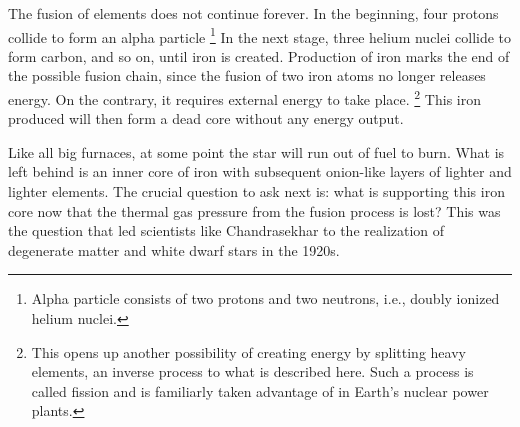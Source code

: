 The fusion of elements does not continue forever.
In the beginning, four protons collide to form an alpha particle%
\footnote{Alpha particle consists of two protons and two neutrons, i.e., doubly ionized helium nuclei.}
In the next stage, three helium nuclei collide to form carbon, and so on, until iron is created.
Production of iron marks the end of the possible fusion chain, since the fusion of two iron atoms no longer releases energy.
On the contrary, it requires external energy to take place.%
\footnote{This opens up another possibility of creating energy by splitting heavy elements, an inverse process to what is described here. Such a process is called fission and is familiarly taken advantage of in Earth's nuclear power plants.}
This iron produced will then form a dead core without any energy output.

Like all big furnaces, at some point the star will run out of fuel to burn.
What is left behind is an inner core of iron with subsequent onion-like layers of lighter and lighter elements.
The crucial question to ask next is: 
what is supporting this iron core now that the thermal gas pressure from the fusion process is lost?
This was the question that led scientists like Chandrasekhar to the realization of degenerate matter and white dwarf stars in the 1920s.


